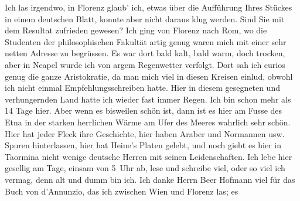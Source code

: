 \begin{ledgroupsized}[t]{13cm}
           \pstart
           Ich las irgendwo, in Florenz glaub’ ich,
                    etwas über die Aufführung Ihres Stückes in
                    einem deutschen Blatt, konnte aber nicht daraus klug werden. Sind Sie mit dem
                    Resultat zufrieden gewesen?\pend
           \pstart
           Ich ging von Florenz nach Rom, wo die Studenten der philosophischen Fakultät artig genug waren mich mit einer sehr
                    netten Adresse zu begrüssen. Es war dort bald kalt, bald warm, doch trocken,
                    aber in Neapel wurde ich von argem
                    Regenwetter verfolgt. Dort sah ich curios genug die ganze Aristokratie, da man
                    mich {\pb}viel in diesen Kreisen
                    einlud, obwohl ich nicht einmal Empfehlungsschreiben hatte.\pend
           \pstart
           Hier in diesem gesegneten und verhungernden Land hatte ich wieder fast immer
                    Regen. Ich bin schon mehr als 14 Tage hier. Aber wenn es bisweilen schön ist,
                    dann ist es hier am Fusse des Etna in der
                    starken herrlichen Wärme am Ufer des Meeres wahrlich sehr schön. Hier hat jeder
                    Fleck ihre Geschichte, hier haben Araber und Normannen usw. Spuren hinterlassen,
                    hier hat Heine’s Platen gelebt, und noch giebt es hier in Taormina nicht wenige deutsche Herren mit seinen
                    Leidenschaften.\pend
           \pstart
           Ich lebe hier gesellig am Tage, einsam {\pb}von 5 Uhr ab, lese und
                    schreibe viel, oder so viel ich vermag, denn alt und dumm bin ich.\pend
           \pstart
           Ich danke Herrn Beer Hofmann viel für das Buch von d’Annunzio, das ich zwischen Wien und Florenz las; es

\end{ledgroupsized}
